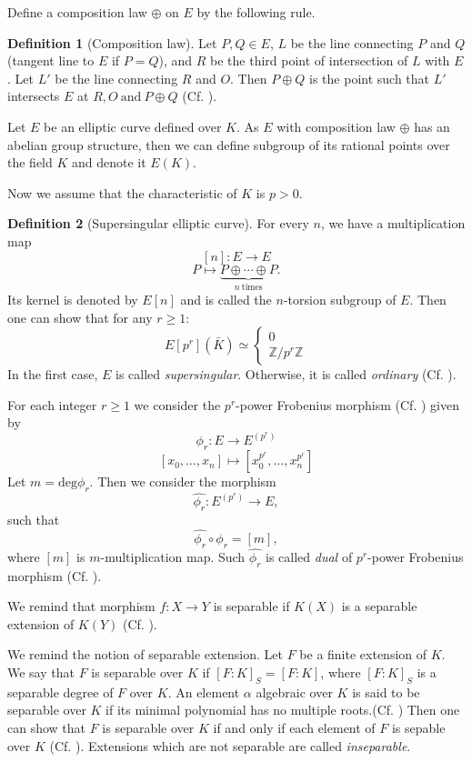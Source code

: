\documentclass{article}
\theoremstyle{theorem}
\theoremstyle{definition}
\newtheorem{definition}{Definition}
\begin{document}
Define a composition law $\oplus$ on $E$ by the following rule.

\begin{definition}[Composition law]
	Let $P, Q \in E$, $L$ be the line connecting $P$ and $Q$ (tangent line to $E$ if $P = Q$), and $R$ be the third point of intersection of $L$ with $E$. Let $L'$ be the line connecting $R$ and $O$. Then $P \oplus Q$ is the point such that $L'$ intersects $E$ at $R, O \ \text{and} \ P \oplus Q$ (Cf. \cite[III, \S2]{Silverman}).
\end{definition}

Let $E$ be an elliptic curve defined over $K$. As $E$ with composition law $\oplus$ has an abelian group structure, then we can define subgroup of its rational points over the field $K$ and denote it $E(K)$. 

Now we assume that the characteristic of $K$ is $p > 0$.

	\begin{definition}[Supersingular elliptic curve] \label{ssedef1}
		For every $n$, we have a multiplication map 
		\[[n]: E \to E\]
		\[ P \mapsto \underbrace{P \oplus \cdots \oplus P}_{n \ \text{times}}. \]
		Its kernel is denoted by $E[n]$ and is called the $n$-torsion subgroup of $E$. Then one can show that for any $r \geq 1$:
		\[ E[p^r](\bar{K}) \simeq
			\begin{cases}
			{0} \\
			\mathbb{Z}/p^r\mathbb{Z}
		\end{cases} \]
		In the first case, $E$ is called \textit{supersingular}. Otherwise, it is called \textit{ordinary} (Cf. \cite[V, \S3, Theorem 3.1]{Silverman}).
	\end{definition}

For each integer $r \geq 1$ we consider the $p^r$-power Frobenius morphism (Cf. \cite[II, \S2]{Silverman}) given by  
	\[\phi_r: E \to E^{(p^r)}\]
	\[ [x_0, \dots, x_n] \mapsto [x_0^{p^r}, \dots, x_n^{p^r}] \]
Let $m = \mathrm{deg}\phi_r$. 
Then we consider the morphism
	\[\hat{\phi_r}: E^{(p^r)} \to E, \]
such that 
	\[ \hat{\phi_r} \circ \phi_r = [m], \]
where $[m]$ is $m$-multiplication map. Such $\hat{\phi_r}$ is called \textit{dual} of $p^r$-power Frobenius morphism (Cf. \cite[III, \S6, Theorem 6.1]{Silverman}). 

We remind that morphism $f: X \to Y$ is separable if $K(X)$ is a separable extension of $K(Y)$ (Cf. \cite[IV, 2]{Hartshorne}).

We remind the notion of separable extension. Let $F$ be a finite extension of $K$. We say that $F$ is separable over $K$ if $[F:K]_S = [F:K]$, where $[F:K]_S$ is a separable degree of $F$ over $K$. An element $\alpha$ algebraic over $K$ is said to be separable over $K$ if its minimal polynomial has no multiple roots.(Cf. \cite[V, \S4]{Lang}) Then one can show that $F$ is separable over $K$ if and only if each element of $F$ is sepable over $K$ (Cf. \cite[V, \S4, Theorem 4.3]{Lang}). Extensions which are not separable are called \textit{inseparable}.
\end{document}
